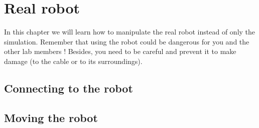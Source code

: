 \chapter{Real robot}

In this chapter we will learn how to manipulate the real robot instead of only the simulation. Remember that using the robot could be dangerous for you and the other lab members ! Besides, you need to be careful and prevent it to make damage (to the cable or to its surroundings).

\section{Connecting to the robot}

\section{Moving the robot}

